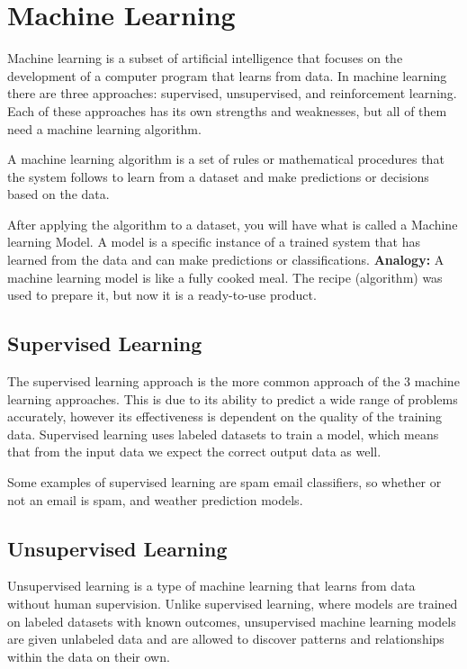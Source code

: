 \section{Machine Learning}
\label{sec:Machine Learning}

Machine learning is a subset of artificial intelligence
that focuses on the development of a computer program that learns from data.
In machine learning there are three approaches: supervised, unsupervised, and reinforcement learning.
Each of these approaches has its own strengths and weaknesses, but all of them need a machine learning algorithm.

A machine learning algorithm is a set of rules or mathematical
procedures that the system follows to learn from a dataset
and make predictions or decisions based on the data.

After applying the algorithm to a dataset, you will have what is called a Machine learning Model.
A model is a specific instance of a trained system that has learned from the data and can make predictions or classifications.
\cite{ML-Models}
\textbf{Analogy:} A machine learning model is like a fully cooked meal.
The recipe (algorithm) was used to prepare it, but now it is a ready-to-use product.

\subsection{Supervised Learning}
The supervised learning approach is the more common approach of the 3 machine learning approaches.
This is due to its ability to predict a wide range of problems accurately,
however its effectiveness is dependent on the quality of the training data.
Supervised learning uses labeled datasets to train a model,
which means that from the input data we expect the correct output data as well.
\cite{GoogleCloud-SL}

Some examples of supervised learning are spam email classifiers,
so whether or not an email is spam, and weather prediction models.

\subsection{Unsupervised Learning}
Unsupervised learning is a type of machine learning that learns from data without human supervision. Unlike supervised learning, 
where models are trained on labeled datasets with known outcomes, unsupervised machine learning models are given unlabeled data 
and are allowed to discover patterns and relationships within the data on their own. 

